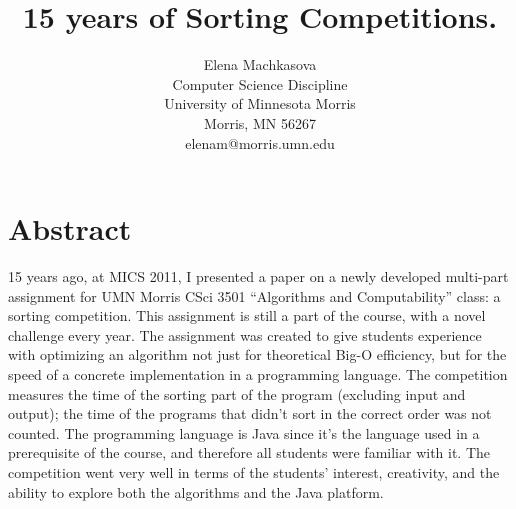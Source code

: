 \documentclass[12pt]{article}
\newcommand{\comment}[1]{}
\begin{document}
\pagestyle{plain}
%

\title{15 years of Sorting Competitions.}
%
%

\author{
Elena Machkasova\\
Computer Science Discipline \\
University of Minnesota Morris\\
Morris, MN 56267\\
elenam@morris.umn.edu
}
\date{}
\maketitle
\thispagestyle{empty}

\section*{\centering Abstract}
15 years ago, at MICS 2011, I presented a paper on a newly developed multi-part assignment for UMN Morris CSci 3501 “Algorithms and Computability” class: a sorting competition. This assignment is still a part of the course, with a novel challenge every year. The assignment was created to give students experience with optimizing an algorithm not just for theoretical Big-O efficiency, but for the speed of a concrete implementation in a programming language. The competition measures the time of the sorting part of the program (excluding input and output); the time of the programs that didn’t sort in the correct order was not counted. The programming language is Java since it’s the language used in a prerequisite of the course, and therefore all students were familiar with it. The competition went very well in terms of the students’ interest, creativity, and the ability to explore both the algorithms and the Java platform. 
\end{document}
